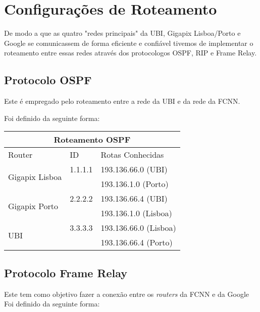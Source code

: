 \section{Configurações de Roteamento}
\label{sec:confroute}
De modo a que as quatro "redes principais" da UBI, Gigapix Lisboa/Porto e Google
se comunicassem de forma eficiente e confiável tivemos de implementar o roteamento entre
essas redes através dos protocologos OSPF, RIP e Frame Relay.

\subsection{Protocolo OSPF}
Este é empregado pelo roteamento entre a rede da UBI e da rede da FCNN.

Foi definido da seguinte forma:

\vspace{3mm}
\setlength{\tabcolsep}{20pt}
\renewcommand{\arraystretch}{1.5}
\noindent
\begin{tabular}{ |l|l|l|}
  \hline
  \multicolumn{3}{|c|}{Roteamento OSPF}                               \\
  \hline
  Router                            & ID      & Rotas Conhecidas      \\
  \hline
  \multirow{2}{1em}{Gigapix Lisboa} & 1.1.1.1 & 193.136.66.0 (UBI)    \\
                                    &         & 193.136.1.0 (Porto)   \\
  \hline
  \multirow{2}{1em}{Gigapix Porto}  & 2.2.2.2 & 193.136.66.4 (UBI)    \\
                                    &         & 193.136.1.0 (Lisboa)  \\
  \hline
  \multirow{2}{1em}{UBI}            & 3.3.3.3 & 193.136.66.0 (Lisboa) \\
                                    &         & 193.136.66.4 (Porto)  \\
  \hline
\end{tabular}
\vspace{5mm}

\subsection{Protocolo Frame Relay}
Este tem como objetivo fazer a conexão entre os \textit{routers} da FCNN e da Google
Foi definido da seguinte forma:

